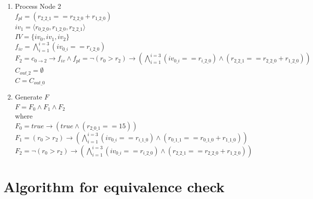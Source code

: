 \documentclass{article}
\begin{document}
\begin{enumerate}
$C = C_{out\_0}$
\item Process Node 2 \\
$f_{pl} = (r_{2\_2\_1} == r_{2\_2\_0} + r_{1\_2\_0})$\\
$iv_1 = \langle r_{0\_2\_0},r_{1\_2\_0},r_{2\_2\_1}\rangle$\\
$IV = \{iv_0, iv_1, iv_2\}$\\
$f_{iv} = \bigwedge_{i=1}^{i=3} (iv_{0\_i} == r_{i\_2\_0})$\\
$F_2 = c_{0\rightarrow 2} \rightarrow f_{iv} \wedge f_{pl} = \neg(r_0 > r_2)\rightarrow (\bigwedge_{i=1}^{i=3} (iv_{0\_i} == r_{i\_2\_0})\wedge (r_{2\_2\_1} == r_{2\_2\_0} + r_{1\_2\_0}))$ \\
$C_{out\_2} = \emptyset$ \\
$C = C_{out\_0}$
\item Generate $F$ \\
$F = F_0 \wedge F_1 \wedge F_2$ \\
where \\
$F_0 = true\rightarrow  (true \wedge (r_{2\_0\_1} == 15))$ \\
$F_1 = (r_0 > r_2)\rightarrow (\bigwedge_{i=1}^{i=3} (iv_{0\_i} == r_{i\_1\_0}) \wedge (r_{0\_1\_1} == r_{0\_1\_0} + r_{1\_1\_0}))$ \\
$F_2 = \neg(r_0 > r_2)\rightarrow (\bigwedge_{i=1}^{i=3} (iv_{0\_i} == r_{i\_2\_0})\wedge (r_{2\_2\_1} == r_{2\_2\_0} + r_{1\_2\_0}))$
\end{enumerate}

\section{Algorithm for equivalence check}
\end{document}
